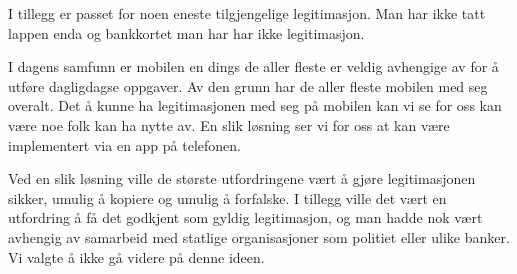 I tillegg er passet for noen eneste tilgjengelige legitimasjon. Man har ikke tatt lappen enda og bankkortet man har har ikke legitimasjon.

I dagens samfunn er mobilen en dings de aller fleste er veldig avhengige av for å utføre dagligdagse oppgaver. Av den grunn har de aller fleste mobilen med seg overalt. Det å kunne ha legitimasjonen med seg på mobilen kan vi se for oss kan være noe folk kan ha nytte av. En slik løsning ser vi for oss at kan være implementert via en app på telefonen.

Ved en slik løsning ville de største utfordringene vært å gjøre legitimasjonen sikker, umulig å kopiere og umulig å forfalske. I tillegg ville det vært en utfordring å få det godkjent som gyldig legitimasjon, og man hadde nok vært avhengig av samarbeid med statlige organisasjoner som politiet eller ulike banker. Vi valgte å ikke gå videre på denne ideen.